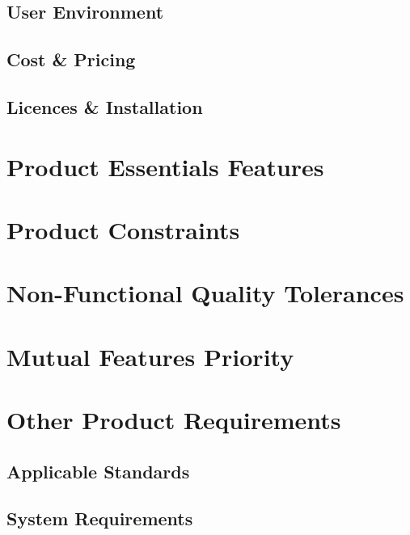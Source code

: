 \documentclass[12pt,a4paper,oneside, titlepage]{article}
\begin{document}
	\subsection{User Environment}
	\subsection{Cost \& Pricing}
	\subsection{Licences \& Installation}
	
    \newpage
	\section{Product Essentials Features}

    \newpage
	\section{Product Constraints}
	
    \newpage
	\section{Non-Functional Quality Tolerances}
	
	\newpage
	\section{Mutual Features Priority}
	
    \newpage
	\section{Other Product Requirements}
	\subsection{Applicable Standards}
	\subsection{System Requirements}
\end{document}
